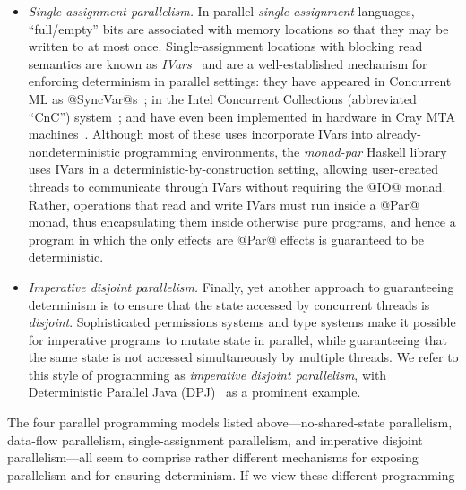 \begin{itemize}
\item \emph{Single-assignment parallelism.}  In
  parallel \emph{single-assignment} languages, ``full/empty'' bits are
  associated with memory locations so that they may be written to at
  most once. Single-assignment locations with blocking read semantics
  are known as \emph{IVars}~\cite{IStructures} and are a
  well-established mechanism for enforcing determinism in parallel
  settings: they have appeared in Concurrent ML as
  @SyncVar@s~\cite{reppy-cml-book}; in the Intel Concurrent
  Collections (abbreviated ``CnC'') system~\cite{CnC}; and have even
  been implemented in hardware in Cray MTA machines~\cite{cray-mta}.
   Although most of these
  uses incorporate IVars into already-nondeterministic programming
  environments, the \emph{monad-par} Haskell library~\cite{monad-par}
  uses IVars in a deterministic-by-construction setting, allowing
  user-created threads to communicate through IVars without requiring
  the @IO@ monad.  Rather, operations that read and write IVars must
  run inside a @Par@ monad, thus encapsulating them inside otherwise
  pure programs, and hence a program in which the only effects are
  @Par@ effects is guaranteed to be deterministic.

\item \emph{Imperative disjoint parallelism.}  Finally, yet another
  approach to guaranteeing determinism is to ensure that the state
  accessed by concurrent threads is \emph{disjoint}.  Sophisticated
  permissions systems and type systems make it possible for imperative
  programs to mutate state in parallel, while guaranteeing that the
  same state is not accessed simultaneously by multiple threads.  We
  refer to this style of programming as \emph{imperative disjoint
    parallelism}, with Deterministic Parallel Java
  (DPJ)~\cite{dpj-oopsla} as a prominent example.
\end{itemize}
The four parallel programming models listed above---no-shared-state
parallelism, data-flow parallelism, single-assignment parallelism, and
imperative disjoint parallelism---all seem to comprise rather different mechanisms for exposing parallelism
and for ensuring determinism.  If we view these different programming
